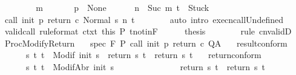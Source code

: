 \begin{isabellebody}
\ \ \isamarkupfalse%
\isanewline
\ \ \ \ \isamarkupfalse%
\ m\isanewline
\ \ \ \ \isamarkupfalse%
\ {\isachardoublequoteopen}{\isasymGamma}\ p\ {\isacharequal}\ None{\isachardoublequoteclose}\isanewline
\ \ \ \ \ \ {\isachardoublequoteopen}n\ {\isacharequal}\ Suc\ m{\isachardoublequoteclose}\ {\isachardoublequoteopen}t\ {\isacharequal}\ Stuck{\isachardoublequoteclose}\isanewline
\ \ \ \ \isamarkupfalse%
\ \isamarkupfalse%
\ {\isachardoublequoteopen}{\isasymGamma}{\isasymturnstile}{\isasymlangle}call\ init\ p\ return{\isacharprime}\ c\ {\isacharcomma}Normal\ s{\isasymrangle}\ {\isacharequal}n{\isasymRightarrow}\ t{\isachardoublequoteclose}\isanewline
\ \ \ \ \ \ \isamarkupfalse%
\ {\isacharparenleft}auto\ intro{\isacharcolon}\ execn{\isacharunderscore}callUndefined{\isacharparenright}\isanewline
\ \ \ \ \isamarkupfalse%
\ valid{\isacharunderscore}call\ {\isacharbrackleft}rule{\isacharunderscore}format{\isacharbrackright}\ ctxt\ this\ P\ t{\isacharunderscore}notin{\isacharunderscore}F\isanewline
\ \ \ \ \isamarkupfalse%
\ {\isacharquery}thesis\isanewline
\ \ \ \ \ \ \isamarkupfalse%
\ {\isacharparenleft}rule\ cnvalidD{\isacharparenright}\isanewline
\ \ \isamarkupfalse%
\isanewline
{}\isamarkupfalse%
%
\endisatagproof
{\isafoldproof}%
%
\isadelimproof
\isanewline
%
\endisadelimproof
\isanewline
\isanewline
{}\isamarkupfalse%
\ ProcModifyReturn{\isacharcolon}\isanewline
\ \ \ spec{\isacharcolon}\ {\isachardoublequoteopen}{\isasymGamma}{\isacharcomma}{\isasymTheta}{\isasymturnstile}\isactrlbsub {\isacharslash}F\isactrlesub \ P\ {\isacharparenleft}call\ init\ p\ return{\isacharprime}\ c{\isacharparenright}\ Q{\isacharcomma}A{\isachardoublequoteclose}\isanewline
\ \ \ result{\isacharunderscore}conform{\isacharcolon}\isanewline
\ \ \ \ \ \ {\isachardoublequoteopen}{\isasymforall}s\ t{\isachardot}\ t\ {\isasymin}\ Modif\ {\isacharparenleft}init\ s{\isacharparenright}\ {\isasymlongrightarrow}\ {\isacharparenleft}return{\isacharprime}\ s\ t{\isacharparenright}\ {\isacharequal}\ {\isacharparenleft}return\ s\ t{\isacharparenright}{\isachardoublequoteclose}\isanewline
\ \ \ return{\isacharunderscore}conform{\isacharcolon}\isanewline
\ \ \ \ \ \ {\isachardoublequoteopen}{\isasymforall}s\ t{\isachardot}\ t\ {\isasymin}\ ModifAbr\ {\isacharparenleft}init\ s{\isacharparenright}\ \isanewline
\ \ \ \ \ \ \ \ \ \ \ \ \ {\isasymlongrightarrow}\ {\isacharparenleft}return{\isacharprime}\ s\ t{\isacharparenright}\ {\isacharequal}\ {\isacharparenleft}return\ s\ t{\isacharparenright}{\isachardoublequoteclose}\isanewline

\end{isabellebody}
